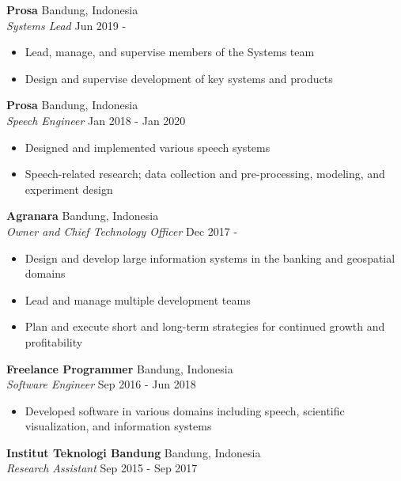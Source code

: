 \documentclass[a4paper]{article}
\begin{document}
\textbf{Prosa} \hfill Bandung, Indonesia\\
\textit{Systems Lead} \hfill Jun 2019 -\\
\vspace{-3mm}
\begin{itemize} \itemsep 1pt
  \item Lead, manage, and supervise members of the Systems team
  \item Design and supervise development of key systems and products
\end{itemize}
\textbf{Prosa} \hfill Bandung, Indonesia\\
\textit{Speech Engineer} \hfill Jan 2018 - Jan 2020\\
\vspace{-3mm}
\begin{itemize} \itemsep 1pt
  \item Designed and implemented various speech systems
  \item Speech-related research; data collection and pre-processing, modeling,
    and experiment design
\end{itemize}
\textbf{Agranara} \hfill Bandung, Indonesia\\
\textit{Owner and Chief Technology Officer} \hfill Dec 2017 -\\
\vspace{-3mm}
\begin{itemize} \itemsep 1pt
	\item Design and develop large information systems in the banking and
    geospatial domains
  \item Lead and manage multiple development teams
  \item Plan and execute short and long-term strategies for continued growth and
    profitability
\end{itemize}
\textbf{Freelance Programmer} \hfill Bandung, Indonesia\\
\textit{Software Engineer} \hfill Sep 2016 - Jun 2018\\
\vspace{-3mm}
\begin{itemize} \itemsep 1pt
	\item Developed software in various domains including speech, scientific
    visualization, and information systems
\end{itemize}
\textbf{Institut Teknologi Bandung} \hfill Bandung, Indonesia\\
\textit{Research Assistant} \hfill Sep 2015 - Sep 2017\\
\end{document}

